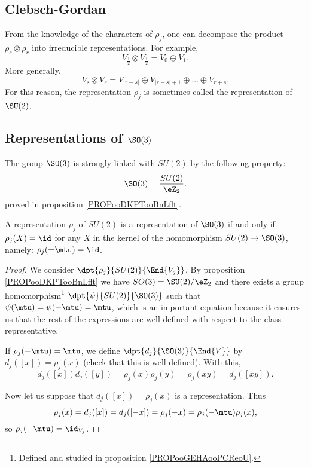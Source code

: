 \subsection{Clebsch-Gordan}

From the knowledge of the characters of $\rho_j$, one can decompose the product $\rho_s\otimes\rho_r$ into irreducible representations. For example,
\[
   V_{\frac{1}{2}}\otimes V_{\frac{1}{2}}=V_0\oplus V_1.
\]
More generally,
\begin{equation}
  V_s\otimes V_r=V_{|r-s|} \oplus V_{|r-s|+1}\oplus\ldots\oplus V_{r+s}.
\end{equation}
For this reason, the representation $\rho_j$ is sometimes called the  representation of $\SU(2)$.

\subsection{Representations of \texorpdfstring{$\SO(3)$}{SO3}}
\label{pg:reprez_SOt}

The group $\SO(3)$ is strongly linked with $SU(2)$ by the following property:
\begin{equation}
   \SO(3)=\frac{SU(2)}{\eZ_2}.
\end{equation}
proved in proposition \ref{PROPooDKPTooBnLflt}.

\begin{lemma}\label{lem:SO_3}
    A representation $\rho_j$ of $SU(2)$ is a representation of $\SO(3)$ if and only if $\rho_j(X)=\id$ for any $X$ in the kernel of the homomorphism $SU(2)\to \SO(3)$, namely: $\rho_j(\pm\mtu)=\id$.
\end{lemma}

\begin{proof}
    We consider $\dpt{\rho_j}{SU(2)}{\End{V_j}}$. By proposition \ref{PROPooDKPTooBnLflt} we have \( SO(3)=\SU(2)/\eZ_2\) and there exists a group homomorphism\footnote{Defined and studied in proposition \ref{PROPooGEHAooPCReoU}.} $\dpt{\psi}{SU(2)}{\SO(3)}$ such that $\psi(\mtu)=\psi(-\mtu)=\mtu$, which is an important equation because it ensures us that the rest of the expressions are well defined with respect to the class representative.

    If $\rho_j(-\mtu)=\mtu$, we define $\dpt{d_j}{\SO(3)}{\End{V}}$ by $d_j([x])=\rho_j(x)$ (check that this is well defined). With this,
    \[
      d_j([x])d_j([y])=\rho_j(x)\rho_j(y)=\rho_j(xy)=d_j([xy]).
    \]

    Now let us suppose that $d_j([x])=\rho_j(x)$ is a representation. Thus
    \[
      \rho_j(x)=d_j([x])=d_j([-x])=\rho_j(-x)=\rho_j(-\mtu)\rho_j(x),
    \]
    so $\rho_j(-\mtu)=\id_{V_j}$.

\end{proof}

